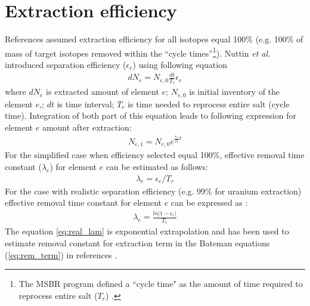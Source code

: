 \section{Extraction efficiency}
References \cite{rykhlevskii_modeling_2019, li_optimization_2018, de_troullioud_de_lanversin_toward_2017, park_whole_2015, sheu_depletion_2013} assumed extraction efficiency for all isotopes equal 100\% (e.g. 100\% of mass of target isotopes removed within the ``cycle times''\footnote{ The \gls{MSBR} program defined a ``cycle time" as the amount of 
time required to reprocess entire salt ($T_r$) \cite{robertson_conceptual_1971}.}). 
Nuttin \emph{et al.} introduced separation efficiency ($\epsilon_e$) using following 
equation \cite{nuttin_potential_2005}
\begin{align}
dN_e = N_{e, 0} \frac{dt}{T_r} \epsilon_e
\end{align}
where $dN_e$ is extracted amount of element $e$; $N_{e, 0}$ is initial inventory 
of the element $e$,; $dt$ is time interval; $T_r$ is time needed to reprocess 
entire salt (cycle time). Integration of both part of this equation leads to 
following expression for element $e$ amount after extraction:
\begin{align}
N_{e, 1} = N_{e, 0} e^{\frac{\epsilon_e}{T_r}t}
\end{align}
For the simplified case when efficiency selected equal 100\%, effective removal 
time constant 
($\lambda_e$) for element $e$ can be estimated as follows:
\begin{align} 
\lambda_e = \epsilon_e / T_r  \label{eq:100_lam}
\end{align}
For the case with realistic separation efficiency (e.g. 99\% for uranium extraction) effective removal time constant for element $e$ can be expressed as
 \cite{nuttin_potential_2005}:
\begin{align}  
\lambda_e = \frac{ln |1-\epsilon_e|}{T_r} \label{eq:real_lam}
\end{align}
The equation \ref{eq:real_lam} is exponential extrapolation and has been used to 
estimate removal constant for 
extraction term in the Bateman equations (\ref{eq:rem_term}) in references \cite{nuttin_potential_2005, betzler_implementation_2017, doligez_coupled_2014}.

